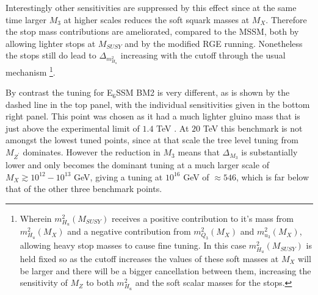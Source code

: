 \documentclass[preprint,amsmath,amssymb,aps,superscriptaddress,prd,showpacs,floatfix,nofootinbib]{revtex4-1}
\begin{document}
Interestingly other sensitivities are suppressed by this effect since
at the same time larger $M_3$ at higher scales reduces the soft squark
masses at $M_X$.  Therefore the stop mass contributions are
ameliorated, compared to the MSSM, both by allowing lighter stops at
$M_{SUSY}$ and by the modified RGE running.  Nonetheless the stops
still do lead to $\Delta_{m_{H_u}^2}$ increasing with the cutoff
through the usual mechanism \footnote{Wherein $m_{H_u}^2(M_{SUSY})$
  receives a positive contribution to it's mass from $m_{H_u}^2(M_X)$
  and a negative contribution from $m_{Q_3}^2(M_X)$ and
  $m_{u_3}^2(M_X)$, allowing heavy stop masses to cause fine
  tuning. In this case $m_{H_u}^2(M_{SUSY})$ is held fixed so as the
  cutoff increases the values of these soft masses at $M_X$ will be
  larger and there will be a bigger cancellation between them,
  increasing the sensitivity of $M_Z$ to both $m_{H_u}^2$ and the soft
  scalar masses for the stops.}.


By contrast the tuning for E$_6$SSM BM2 is very different, as is shown
by the dashed line in the top panel, with the individual sensitivities given in the
bottom right panel. This point was chosen as it had a much lighter
gluino mass that is just above the experimental limit of $1.4$ TeV
\cite{Aad:2014lra}.  At $20$ TeV this benchmark is not amongst the
lowest tuned points, since at that scale the tree level tuning from
$M_{Z^\prime}$ dominates.  However the reduction in $M_3$ means that
$\Delta_{M_3}$ is substantially lower and only becomes the dominant
tuning at a much larger scale of $M_X\gtrsim 10^{12}-10^{13}$ GeV,
giving a tuning at $10^{16}$ GeV of $\approx 546$, which is far below
that of the other three benchmark points.
\end{document}
